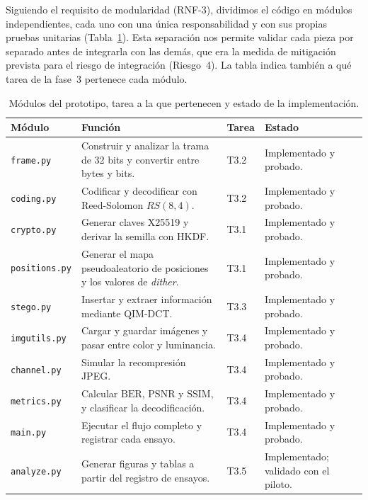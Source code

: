 \documentclass[IB]{TFUOC}%
\begin{document}
Siguiendo el requisito de modularidad (RNF-3), dividimos el código en módulos independientes, cada uno con una única responsabilidad y con sus propias pruebas unitarias (Tabla~\ref{tab:modulos}). Esta separación nos permite validar cada pieza por separado antes de integrarla con las demás, que era la medida de mitigación prevista para el riesgo de integración (Riesgo~4). La tabla indica también a qué tarea de la fase~3 pertenece cada módulo.

\begin{table}[H]
\centering
\scriptsize
\caption{Módulos del prototipo, tarea a la que pertenecen y estado de la implementación.}
\label{tab:modulos}
\begin{tabular}{|p{2.5cm}|p{6.6cm}|p{1.1cm}|p{3.2cm}|}
\hline
\rowcolor{uocnavy}
\color{white}\textbf{Módulo} &
\color{white}\textbf{Función} &
\color{white}\textbf{Tarea} &
\color{white}\textbf{Estado} \\
\hline
\texttt{frame.py} & Construir y analizar la trama de 32 bits y convertir entre bytes y bits. & T3.2 & Implementado y probado. \\
\hline
\texttt{coding.py} & Codificar y decodificar con Reed-Solomon $RS(8,4)$. & T3.2 & Implementado y probado. \\
\hline
\texttt{crypto.py} & Generar claves X25519 y derivar la semilla con HKDF. & T3.1 & Implementado y probado. \\
\hline
\texttt{positions.py} & Generar el mapa pseudoaleatorio de posiciones y los valores de \textit{dither}. & T3.1 & Implementado y probado. \\
\hline
\texttt{stego.py} & Insertar y extraer información mediante QIM-DCT. & T3.3 & Implementado y probado. \\
\hline
\texttt{imgutils.py} & Cargar y guardar imágenes y pasar entre color y luminancia. & T3.4 & Implementado y probado. \\
\hline
\texttt{channel.py} & Simular la recompresión JPEG. & T3.4 & Implementado y probado. \\
\hline
\texttt{metrics.py} & Calcular $\mathrm{BER}$, $\mathrm{PSNR}$ y $\mathrm{SSIM}$, y clasificar la decodificación. & T3.4 & Implementado y probado. \\
\hline
\texttt{main.py} & Ejecutar el flujo completo y registrar cada ensayo. & T3.4 & Implementado y probado. \\
\hline
\texttt{analyze.py} & Generar figuras y tablas a partir del registro de ensayos. & T3.5 & Implementado; validado con el piloto. \\
\hline
\end{tabular}
\end{table}
\end{document}
